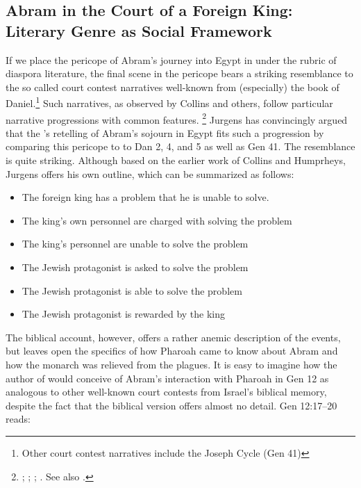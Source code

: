 \subsection{Abram in the Court of a Foreign King: Literary Genre as Social Framework}

If we place the pericope of Abram's journey into Egypt in \ga under the rubric of diaspora literature, the final scene in the pericope bears a striking resemblance to the so called court contest narratives well-known from (especially) the book of Daniel.\footnote{Other court contest narratives include the Joseph Cycle (Gen 41)} Such narratives, as observed by Collins and others, follow particular narrative progressions with common features.%
%
\footnote{\cite[38--52]{collins1993}; \cite{humphreys_jbl1973}; \cite{collins_jbl1975}; \cite{wills1990}. See also \cite{niditch-doran_jbl1977}.}
%
Jurgens has convincingly argued that the \ga's retelling of Abram's sojourn in Egypt fits such a progression by comparing this pericope to to Dan 2, 4, and 5 as well as Gen 41. The resemblance is quite striking. Although based on the earlier work of Collins and Humprheys, Jurgens offers his own outline, which can be summarized as follows\autocite[21]{jurgens_jsj2018}:

\begin{SingleSpace}
\begin{itemize}
    \item The foreign king has a problem that he is unable to solve.
    \item The king's own personnel are charged with solving the problem
    \item The king's personnel are unable to solve the problem
    \item The Jewish protagonist is asked to solve the problem
    \item The Jewish protagonist is able to solve the problem
    \item The Jewish protagonist is rewarded by the king
\end{itemize}
\end{SingleSpace}

The biblical account, however, offers a rather anemic description of the events, but leaves open the specifics of how Pharoah came to know about Abram and how the monarch was relieved from the plagues. 
It is easy to imagine how the author of \ga would conceive of Abram's interaction with Pharoah in Gen 12 as analogous to other well-known court contests from Israel's biblical memory, despite the fact that the biblical version offers almost no detail. Gen 12:17--20 reads: 

